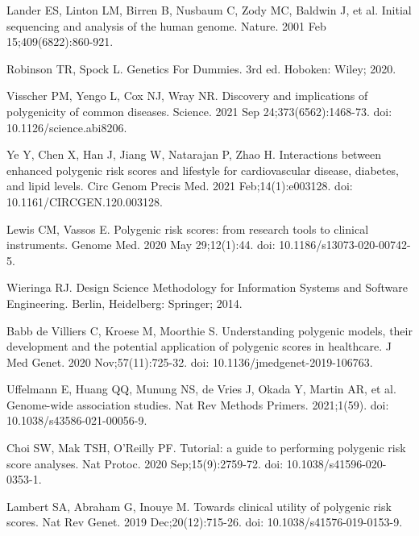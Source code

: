 \begin{thebibliography}{10}

       Lander ES, Linton LM, Birren B, Nusbaum C, Zody MC, Baldwin J, et al.
       \newblock Initial sequencing and analysis of the human genome.
       \newblock Nature. 2001 Feb 15;409(6822):860-921.

       Robinson TR, Spock L.
       \newblock Genetics For Dummies.
       \newblock 3rd ed. Hoboken: Wiley; 2020.

       Visscher PM, Yengo L, Cox NJ, Wray NR.
       \newblock Discovery and implications of polygenicity of common diseases.
       \newblock Science. 2021 Sep 24;373(6562):1468-73. doi: 10.1126/science.abi8206.

       Ye Y, Chen X, Han J, Jiang W, Natarajan P, Zhao H.
       \newblock Interactions between enhanced polygenic risk scores and lifestyle for cardiovascular disease, diabetes, and lipid levels.
       \newblock Circ Genom Precis Med. 2021 Feb;14(1):e003128. doi: 10.1161/CIRCGEN.120.003128.
    
       Lewis CM, Vassos E.
       \newblock Polygenic risk scores: from research tools to clinical instruments.
       \newblock Genome Med. 2020 May 29;12(1):44. doi: 10.1186/s13073-020-00742-5.

       Wieringa RJ.
       \newblock Design Science Methodology for Information Systems and Software Engineering.
       \newblock Berlin, Heidelberg: Springer; 2014.

       Babb de Villiers C, Kroese M, Moorthie S.
       \newblock Understanding polygenic models, their development and the potential application of polygenic scores in healthcare.
       \newblock J Med Genet. 2020 Nov;57(11):725-32. doi: 10.1136/jmedgenet-2019-106763.

       Uffelmann E, Huang QQ, Munung NS, de Vries J, Okada Y, Martin AR, et al.
       \newblock Genome-wide association studies.
       \newblock Nat Rev Methods Primers. 2021;1(59). doi: 10.1038/s43586-021-00056-9.

       Choi SW, Mak TSH, O'Reilly PF.
       \newblock Tutorial: a guide to performing polygenic risk score analyses.
       \newblock Nat Protoc. 2020 Sep;15(9):2759-72. doi: 10.1038/s41596-020-0353-1.

       Lambert SA, Abraham G, Inouye M.
       \newblock Towards clinical utility of polygenic risk scores.
       \newblock Nat Rev Genet. 2019 Dec;20(12):715-26. doi: 10.1038/s41576-019-0153-9.


\end{thebibliography}
